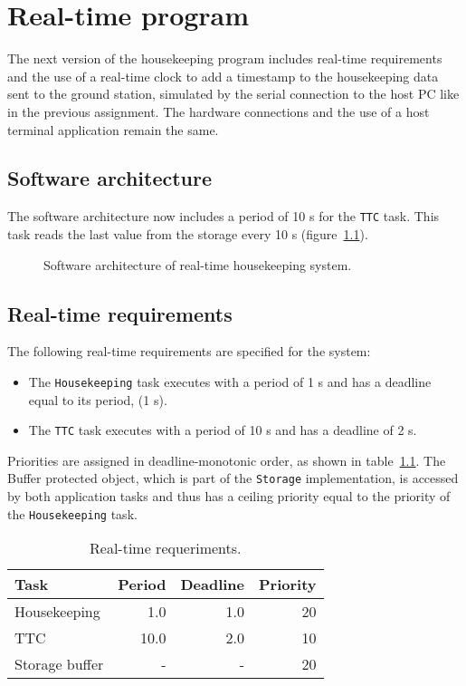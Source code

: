 \chapter{Real-time program}\label{ch:Assignment6}

The next version of the housekeeping program includes real-time requirements and the use of a real-time clock to add a timestamp to the housekeeping data sent to the ground station, simulated by the serial connection to the host PC like in the previous assignment. The hardware connections and the use of a host terminal application remain the same.

\section{Software architecture}

The software architecture now includes a period of 10 s for the {\tt TTC} task. This task reads the last value from the storage every 10 s (figure~\ref{fig:real-time}).

\begin{figure}[h]
            \caption{Software architecture of real-time housekeeping system.}
            \label{fig:real-time}
\end{figure}

\section{Real-time requirements}

The following real-time requirements are specified for the system:
\begin{itemize}
\item The {\tt Housekeeping} task executes with a period of 1 s and has a deadline equal to its period, (1 s).
\item The {\tt TTC} task executes with a period of 10 s and has a deadline of 2 s.
\end{itemize}

Priorities are assigned in deadline-monotonic order, as shown in table~\ref{tb:requeriments}. The Buffer protected object, which is part of the {\tt Storage} implementation, is accessed by both application tasks and thus has a ceiling priority equal to the priority of the {\tt Housekeeping} task.

\begin{table}[htb]
\begin{center}
\begin{tabular}{|l|r|r|r|} \hline
Task & Period & Deadline & Priority\\ \hline
Housekeeping & 1.0 & 1.0 & 20 \\
TTC & 10.0 & 2.0 & 10 \\
Storage buffer & - & - & 20 \\ \hline
\end{tabular}
\caption{Real-time requeriments.}
\label{tb:requeriments}
\end{center}
\end{table}

